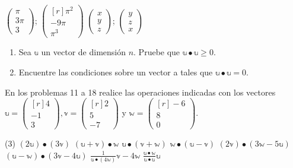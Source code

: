 \begin{tasks}[
    style=enumerate,
    ]
    \task $\begin{pmatrix*}\pi \\ 3\pi \\ 3\end{pmatrix*}$; $\begin{pmatrix*}[r]\pi^{2} \\ -9 \pi \\ \pi^{3}\end{pmatrix*}$
    \task $\begin{pmatrix*}x \\ y \\ z\end{pmatrix*}$; $\begin{pmatrix*}y \\ z \\ x\end{pmatrix*}$
\end{tasks}
\begin{enumerate}[start=9]
    \item Sea $\mathbb{u}$ un vector de dimensión $n$. Pruebe que $\mathbb{u} \bullet \mathbb{u} \geq 0$.
    \item Encuentre las condiciones sobre un vector a tales que $\mathbb{u} \bullet \mathbb{u}=0$.
\end{enumerate}
En los problemas 11 a 18 realice las operaciones indicadas con los vectores $\mathbb{u}=\begin{pmatrix*}[r]4 \\ -1 \\ 3\end{pmatrix*}, \mathbb{v}=\begin{pmatrix*}[r]2 \\ 5 \\ -7\end{pmatrix*}$ y $\mathbb{w}=\begin{pmatrix*}[r]-6 \\ 8 \\ 0\end{pmatrix*}$.
\begin{tasks}[
    start=11,
    style=enumerate,
    label-offset = 3mm,
    ](3)
    \task $(2 \mathbb{u}) \bullet (3 \mathbb{v})$
    \task  $(\mathbb{u}+\mathbb{v}) \bullet \mathbb{w}$
    \task $\mathbb{u} \bullet (\mathbb{v}+\mathbb{w})$
    \task $\mathbb{w} \bullet (\mathbb{u}-\mathbb{v})$
    \task $(2 \mathbb{v}) \bullet (3 \mathbb{w}-5 \mathbb{u})$
    \task $(\mathbb{u}-\mathbb{w}) \bullet (3 \mathbb{v}-4 \mathbb{u})$
    \task $\displaystyle \frac{1}{\mathbb{u} \bullet (4 \mathbb{w})} \mathbb{v}-4 \mathbb{w}$
    \task $\displaystyle \frac{\mathbb{u} \bullet \mathbb{w}}{\mathbb{u} \bullet \mathbb{u}} \mathbb{u}$
\end{tasks}
